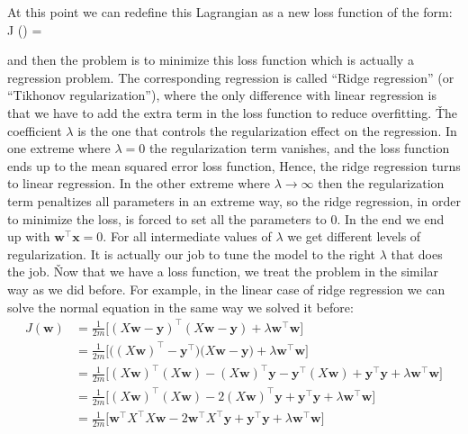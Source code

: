 At this point we can redefine this Lagrangian as a new loss function of the form:
\bse
J () =  
\ese

and then the problem is to minimize this loss function which is actually a regression problem. The corresponding
regression is called ``Ridge regression'' (or ``Tikhonov regularization''), where the only difference with linear
regression is that we have to add the extra term in the loss function to reduce overfitting. \v

The coefficient $\lambda$ is the one that controls the regularization effect on the regression. In one extreme where
$\lambda=0$ the regularization term vanishes, and the loss function ends up to the mean squared error loss function,
Hence, the ridge regression turns to linear regression. In the other extreme where $\lambda \to \infty$ then the
regularization term penaltizes all parameters in an extreme way, so the ridge regression, in order to minimize the
loss, is forced to set all the parameters to 0. In the end we end up with $\boldsymbol{w}^{\intercal} \boldsymbol{x}
= 0$. For all intermediate values of $\lambda$ we get different levels of regularization. It is actually our job to
tune the model to the right $\lambda$ that does the job. \v

Now that we have a loss function, we treat the problem in the similar way as we did before. For example, in the
linear case of ridge regression we can solve the normal equation in the same way we solved it before:
{\setlength{\jot}{10pt}
\begin{align*}
J(\boldsymbol{w}) &= \frac{1}{2m} \Big[ (X \boldsymbol{w} - \boldsymbol{y})^{\intercal} (X \boldsymbol{w}
- \boldsymbol{y}) + \lambda \boldsymbol{w}^{\intercal} \boldsymbol{w} \Big]\\
&= \frac{1}{2m} \Big[ \Big( (X \boldsymbol{w})^{\intercal} - \boldsymbol{y}^{\intercal} \Big)
\Big(X\boldsymbol{w} - \boldsymbol{y} \Big) + \lambda \boldsymbol{w}^{\intercal} \boldsymbol{w} \Big]\\
&= \frac{1}{2m} \Big[ (X \boldsymbol{w})^{\intercal} (X \boldsymbol{w}) - (X \boldsymbol{w})^{\intercal}
\boldsymbol{y} - \boldsymbol{y}^{\intercal} (X \boldsymbol{w}) + \boldsymbol{y}^{\intercal} \boldsymbol{y}
+ \lambda \boldsymbol{w}^{\intercal} \boldsymbol{w} \Big] \\
&= \frac{1}{2m} \Big[ (X \boldsymbol{w})^{\intercal} (X \boldsymbol{w}) - 2 (X \boldsymbol{w})^{\intercal}
\boldsymbol{y} + \boldsymbol{y}^{\intercal} \boldsymbol{y} + \lambda \boldsymbol{w}^{\intercal} \boldsymbol{w} \Big] \\
&= \frac{1}{2m} \Big[ \boldsymbol{w}^{\intercal} X^{\intercal} X \boldsymbol{w} - 2 \boldsymbol{w}^{\intercal}
X^{\intercal} \boldsymbol{y} + \boldsymbol{y}^{\intercal} \boldsymbol{y}
+ \lambda \boldsymbol{w}^{\intercal} \boldsymbol{w} \Big]
\end{align*}}

